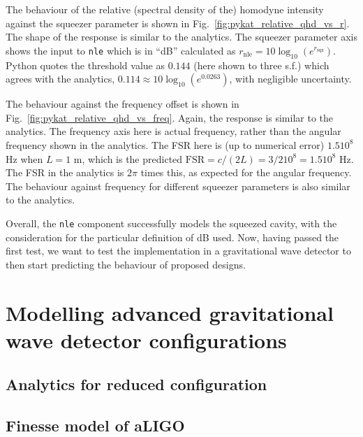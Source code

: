 \documentclass[aps,pra,superscriptaddress,reprint,nofootinbib]{revtex4-1}
\newcommand{\code}[1]{\texttt{#1}}
\begin{document}
The behaviour of the relative (spectral density of the) homodyne intensity against the squeezer parameter is shown in Fig.~\ref{fig:pykat_relative_qhd_vs_r}. The shape of the response is similar to the analytics. The squeezer parameter axis shows the input to \code{nle} which is in ``dB'' calculated as $r_{\mathrm{nle}} = 10 \log_{10}(e^{r_\mathrm{sqz}})$. Python quotes the threshold value as $0.144$ (here shown to three s.f.) which agrees with the analytics, $0.114 \approx 10 \log_{10}(e^{0.0263})$, with negligible uncertainty.


The behaviour against the frequency offset is shown in Fig.~\ref{fig:pykat_relative_qhd_vs_freq}. Again, the response is similar to the analytics. The frequency axis here is actual frequency, rather than the angular frequency shown in the analytics. The FSR here is (up to numerical error) $1.5 10^8$ Hz when $L = 1$ m, which is the predicted $\mathrm{FSR} = c/(2 L) = 3/2 10^8 = 1.5 10^8$ Hz. The FSR in the analytics is $2 \pi$ times this, as expected for the angular frequency. The behaviour against frequency for different squeezer parameters is also similar to the analytics.


Overall, the \code{nle} component successfully models the squeezed cavity, with the consideration for the particular definition of dB used. Now, having passed the first test, we want to test the implementation in a gravitational wave detector to then start predicting the behaviour of proposed designs.


\section{Modelling advanced gravitational wave detector configurations}
\label{sec:aLIGOcomparison}

\subsection{Analytics for reduced configuration}


\subsection{Finesse model of aLIGO}

\end{document}
